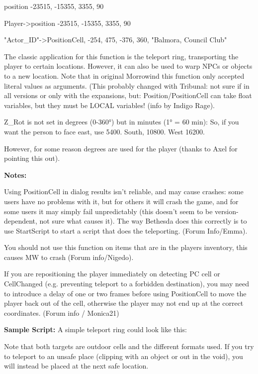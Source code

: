 \documentclass[
]{article}
\begin{document}
position -23515, -15355, 3355, 90

Player-\textgreater position -23515, -15355, 3355, 90

"Actor\_ID"-\textgreater PositionCell, -254, 475, -376, 360, "Balmora,
Council Club"

The classic application for this function is the teleport ring,
transporting the player to certain locations. However, it can also be
used to warp NPCs or objects to a new location. Note that in original
Morrowind this function only accepted literal values as arguments. (This
probably changed with Tribunal: not sure if in all versions or only with
the expansions, but: Position/PositionCell can take float variables, but
they must be LOCAL variables! (info by Indigo Rage).

Z\_Rot is not set in degrees (0-360°) but in minutes (1° = 60 min): So,
if you want the person to face east, use 5400. South, 10800. West 16200.

However, for some reason degrees are used for the player (thanks to Axel
for pointing this out).

\textbf{Notes:}

Using PositionCell in dialog results isn't reliable, and may cause
crashes: some users have no problems with it, but for others it will
crash the game, and for some users it may simply fail unpredictably
(this doesn't seem to be version-dependent, not sure what causes it).
The way Bethesda does this correctly is to use StartScript to start a
script that does the teleporting. (Forum Info/Emma).

You should not use this function on items that are in the players
inventory, this causes MW to crash (Forum info/Nigedo).

If you are repositioning the player immediately on detecting PC cell or
CellChanged (e.g. preventing teleport to a forbidden destination), you
may need to introduce a delay of one or two frames before using
PositionCell to move the player back out of the cell, otherwise the
player may not end up at the correct coordinates. (Forum info /
Monica21)

\textbf{Sample Script:} A simple teleport ring could look like this:



Note that both targets are outdoor cells and the different formats used.
If you try to teleport to an unsafe place (clipping with an object or
out in the void), you will instead be placed at the next safe location.
\end{document}
